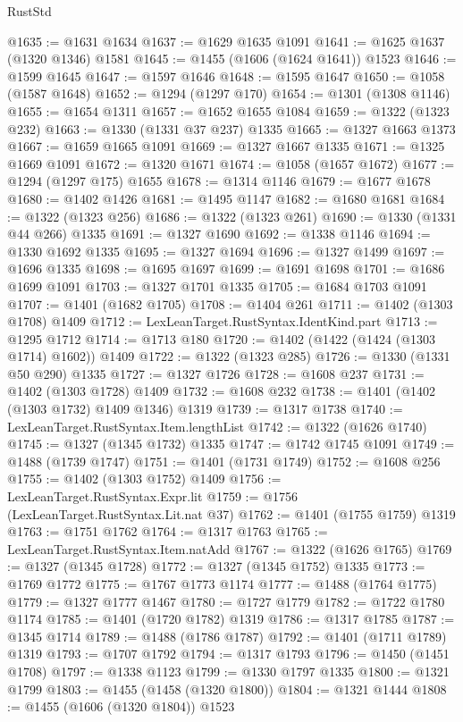 \begin{lexlean}{RustStd}
\begin{coremodule}
{\begin{coremodule}
{{{{{{{{{{{{{{{{{{{{{{{{{{{{{{{{{{{{{{@1635 := @1631 @1634
@1637 := @1629 @1635 @1091
@1641 := @1625 @1637 (@1320 @1346) @1581
@1645 := @1455 (@1606 (@1624 @1641)) @1523
@1646 := @1599 @1645
@1647 := @1597 @1646
@1648 := @1595 @1647
@1650 := @1058 (@1587 @1648)
@1652 := @1294 (@1297 @170)
@1654 := @1301 (@1308 @1146)
@1655 := @1654 @1311
@1657 := @1652 @1655 @1084
@1659 := @1322 (@1323 @232)
@1663 := @1330 (@1331 @37 @237) @1335
@1665 := @1327 @1663 @1373
@1667 := @1659 @1665 @1091
@1669 := @1327 @1667 @1335
@1671 := @1325 @1669 @1091
@1672 := @1320 @1671
@1674 := @1058 (@1657 @1672)
@1677 := @1294 (@1297 @175) @1655
@1678 := @1314 @1146
@1679 := @1677 @1678
@1680 := @1402 @1426
@1681 := @1495 @1147
@1682 := @1680 @1681
@1684 := @1322 (@1323 @256)
@1686 := @1322 (@1323 @261)
@1690 := @1330 (@1331 @44 @266) @1335
@1691 := @1327 @1690
@1692 := @1338 @1146
@1694 := @1330 @1692 @1335
@1695 := @1327 @1694
@1696 := @1327 @1499
@1697 := @1696 @1335
@1698 := @1695 @1697
@1699 := @1691 @1698
@1701 := @1686 @1699 @1091
@1703 := @1327 @1701 @1335
@1705 := @1684 @1703 @1091
@1707 := @1401 (@1682 @1705)
@1708 := @1404 @261
@1711 := @1402 (@1303 @1708) @1409
@1712 := LexLeanTarget.RustSyntax.IdentKind.part
@1713 := @1295 @1712
@1714 := @1713 @180
@1720 := @1402 (@1422 (@1424 (@1303 @1714) @1602)) @1409
@1722 := @1322 (@1323 @285)
@1726 := @1330 (@1331 @50 @290) @1335
@1727 := @1327 @1726
@1728 := @1608 @237
@1731 := @1402 (@1303 @1728) @1409
@1732 := @1608 @232
@1738 := @1401 (@1402 (@1303 @1732) @1409 @1346) @1319
@1739 := @1317 @1738
@1740 := LexLeanTarget.RustSyntax.Item.lengthList
@1742 := @1322 (@1626 @1740)
@1745 := @1327 (@1345 @1732) @1335
@1747 := @1742 @1745 @1091
@1749 := @1488 (@1739 @1747)
@1751 := @1401 (@1731 @1749)
@1752 := @1608 @256
@1755 := @1402 (@1303 @1752) @1409
@1756 := LexLeanTarget.RustSyntax.Expr.lit
@1759 := @1756 (LexLeanTarget.RustSyntax.Lit.nat @37)
@1762 := @1401 (@1755 @1759) @1319
@1763 := @1751 @1762
@1764 := @1317 @1763
@1765 := LexLeanTarget.RustSyntax.Item.natAdd
@1767 := @1322 (@1626 @1765)
@1769 := @1327 (@1345 @1728)
@1772 := @1327 (@1345 @1752) @1335
@1773 := @1769 @1772
@1775 := @1767 @1773 @1174
@1777 := @1488 (@1764 @1775)
@1779 := @1327 @1777 @1467
@1780 := @1727 @1779
@1782 := @1722 @1780 @1174
@1785 := @1401 (@1720 @1782) @1319
@1786 := @1317 @1785
@1787 := @1345 @1714
@1789 := @1488 (@1786 @1787)
@1792 := @1401 (@1711 @1789) @1319
@1793 := @1707 @1792
@1794 := @1317 @1793
@1796 := @1450 (@1451 @1708)
@1797 := @1338 @1123
@1799 := @1330 @1797 @1335
@1800 := @1321 @1799
@1803 := @1455 (@1458 (@1320 @1800))
@1804 := @1321 @1444
@1808 := @1455 (@1606 (@1320 @1804)) @1523
}}}}}}}}}}}}}}}}}}}}}}}}}}}}}}}}}}}}}}
\end{coremodule}}
\end{coremodule}
\end{lexlean}

